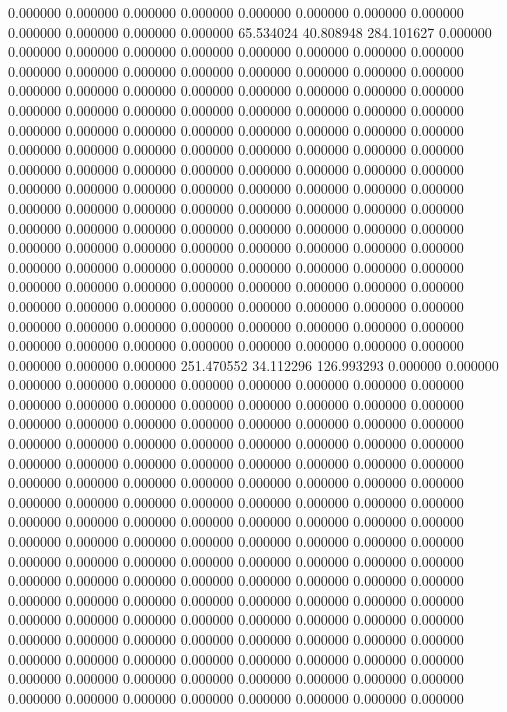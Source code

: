 0.000000 0.000000 0.000000
0.000000 0.000000 0.000000
0.000000 0.000000 0.000000
0.000000 0.000000 0.000000
65.534024 40.808948 284.101627
0.000000 0.000000 0.000000
0.000000 0.000000 0.000000
0.000000 0.000000 0.000000
0.000000 0.000000 0.000000
0.000000 0.000000 0.000000
0.000000 0.000000 0.000000
0.000000 0.000000 0.000000
0.000000 0.000000 0.000000
0.000000 0.000000 0.000000
0.000000 0.000000 0.000000
0.000000 0.000000 0.000000
0.000000 0.000000 0.000000
0.000000 0.000000 0.000000
0.000000 0.000000 0.000000
0.000000 0.000000 0.000000
0.000000 0.000000 0.000000
0.000000 0.000000 0.000000
0.000000 0.000000 0.000000
0.000000 0.000000 0.000000
0.000000 0.000000 0.000000
0.000000 0.000000 0.000000
0.000000 0.000000 0.000000
0.000000 0.000000 0.000000
0.000000 0.000000 0.000000
0.000000 0.000000 0.000000
0.000000 0.000000 0.000000
0.000000 0.000000 0.000000
0.000000 0.000000 0.000000
0.000000 0.000000 0.000000
0.000000 0.000000 0.000000
0.000000 0.000000 0.000000
0.000000 0.000000 0.000000
0.000000 0.000000 0.000000
0.000000 0.000000 0.000000
0.000000 0.000000 0.000000
0.000000 0.000000 0.000000
0.000000 0.000000 0.000000
0.000000 0.000000 0.000000
0.000000 0.000000 0.000000
0.000000 0.000000 0.000000
0.000000 0.000000 0.000000
0.000000 0.000000 0.000000
0.000000 0.000000 0.000000
0.000000 0.000000 0.000000
251.470552 34.112296 126.993293
0.000000 0.000000 0.000000
0.000000 0.000000 0.000000
0.000000 0.000000 0.000000
0.000000 0.000000 0.000000
0.000000 0.000000 0.000000
0.000000 0.000000 0.000000
0.000000 0.000000 0.000000
0.000000 0.000000 0.000000
0.000000 0.000000 0.000000
0.000000 0.000000 0.000000
0.000000 0.000000 0.000000
0.000000 0.000000 0.000000
0.000000 0.000000 0.000000
0.000000 0.000000 0.000000
0.000000 0.000000 0.000000
0.000000 0.000000 0.000000
0.000000 0.000000 0.000000
0.000000 0.000000 0.000000
0.000000 0.000000 0.000000
0.000000 0.000000 0.000000
0.000000 0.000000 0.000000
0.000000 0.000000 0.000000
0.000000 0.000000 0.000000
0.000000 0.000000 0.000000
0.000000 0.000000 0.000000
0.000000 0.000000 0.000000
0.000000 0.000000 0.000000
0.000000 0.000000 0.000000
0.000000 0.000000 0.000000
0.000000 0.000000 0.000000
0.000000 0.000000 0.000000
0.000000 0.000000 0.000000
0.000000 0.000000 0.000000
0.000000 0.000000 0.000000
0.000000 0.000000 0.000000
0.000000 0.000000 0.000000
0.000000 0.000000 0.000000
0.000000 0.000000 0.000000
0.000000 0.000000 0.000000
0.000000 0.000000 0.000000
0.000000 0.000000 0.000000
0.000000 0.000000 0.000000
0.000000 0.000000 0.000000
0.000000 0.000000 0.000000
0.000000 0.000000 0.000000
0.000000 0.000000 0.000000
